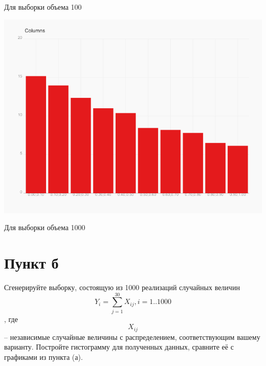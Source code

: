 \documentclass{article}
\begin{document}
Для выборки объема 100

\includegraphics[scale=0.7]{columns(1).jpg}

Для выборки объема 1000

\section*{Пункт б}
Сгенерируйте выборку, состоящую из 1000 реализаций случайных величин
$$Y_{i} = \sum_{j=1}^{30} X_{ij}, i = 1..1000 $$,
где $$ X_{ij} $$ – независимые случайные величины с распределением, соответствующим вашему варианту. Постройте гистограмму для полученных данных, сравните её с графиками из пункта (а).
\end{document}
